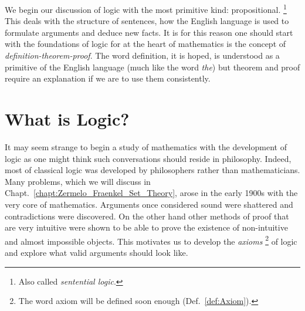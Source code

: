 We begin our discussion of logic with the most primitive kind:
propositional.%
\footnote{%
    Also called \textit{sentential logic}.%
}
This deals with the structure of sentences, how the English language is used to
formulate arguments and deduce new facts. It is for this reason one should start
with the foundations of logic for at the heart of mathematics is the concept of
\textit{definition-theorem-proof}. The word definition, it is hoped, is
understood as a primitive of the English language (much like the word
\textit{the}) but theorem and proof require an explanation if we are to use them
consistently.
\section{What is Logic?}
    It may seem strange to begin a study of mathematics with the development of
    logic as one might think such conversations should reside in philosophy.
    Indeed, most of classical logic was developed by philosophers rather than
    mathematicians. Many problems, which we will discuss in
    Chapt.~\ref{chapt:Zermelo_Fraenkel_Set_Theory}, arose in the early 1900s
    with the very core of mathematics. Arguments once considered sound were
    shattered and contradictions were discovered. On the other hand
    other methods of proof that are very intuitive were shown to be able to
    prove the existence of non-intuitive and almost impossible objects. This
    motivates us to develop the \textit{axioms}%
    \footnote{%
        The word axiom will be defined soon enough (Def.~\ref{def:Axiom}).
    }
    of logic and explore what valid arguments should look like.
